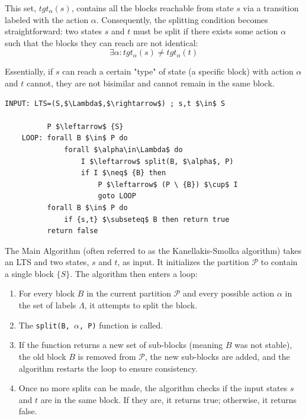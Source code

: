 This set, $tgt_{\alpha}(s)$, contains all the blocks reachable from state $s$ via a transition labeled with the action $\alpha$. Consequently, the splitting condition becomes straightforward: two states $s$ and $t$ must be split if there exists some action $\alpha$ such that the blocks they can reach are not identical:
\begin{equation*}
    \exists \alpha : tgt_{\alpha}(s) \neq tgt_{\alpha}(t)
\end{equation*}

Essentially, if $s$ can reach a certain "type" of state (a specific block) with action $\alpha$ and $t$ cannot, they are not bisimilar and cannot remain in the same block.

\begin{lstlisting}[mathescape, caption={RCPP algorithm.}, captionpos=b]
    INPUT: LTS=(S,$\Lambda$,$\rightarrow$) ; s,t $\in$ S
    
          P $\leftarrow$ {S}
    LOOP: forall B $\in$ P do
              forall $\alpha\in\Lambda$ do
                  I $\leftarrow$ split(B, $\alpha$, P)
                  if I $\neq$ {B} then
                      P $\leftarrow$ (P \ {B}) $\cup$ I
                      goto LOOP
          forall B $\in$ P do
              if {s,t} $\subseteq$ B then return true
          return false
\end{lstlisting}

The Main Algorithm (often referred to as the Kanellakis-Smolka algorithm) takes an LTS and two states, $s$ and $t$, as input. 
It initializes the partition $\mathcal{P}$ to contain a single block $\{S\}$. The algorithm then enters a loop:
\begin{enumerate}
    \item For every block $B$ in the current partition $\mathcal{P}$ and every possible action $\alpha$ in the set of labels $\Lambda$, it attempts to split the block. 
    \item The \texttt{split(B, $\alpha$, P)} function is called.
    \item If the function returns a new set of sub-blocks (meaning $B$ was not stable), the old block $B$ is removed from $\mathcal{P}$, the new sub-blocks are added, and the algorithm restarts the loop to ensure consistency.  
    \item Once no more splits can be made, the algorithm checks if the input states $s$ and $t$ are in the same block. If they are, it returns true; otherwise, it returns false.  
\end{enumerate}

